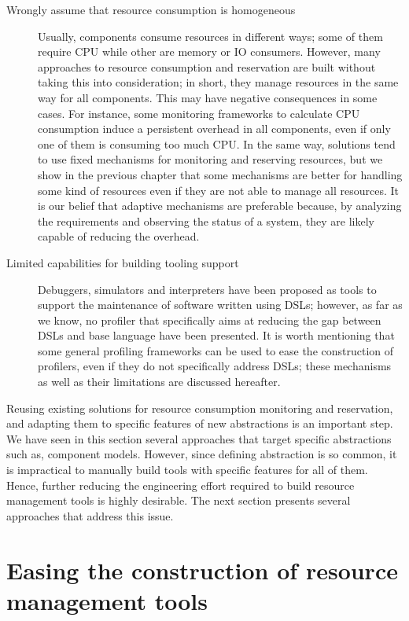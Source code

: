 \begin{description}
\item[Wrongly assume that resource consumption is homogeneous]
Usually, components consume resources in different ways; some of them require CPU while other are memory or IO consumers.
However, many approaches to resource consumption and reservation are built without taking this into consideration; in short, they manage resources in the same way for all components.
This may have negative consequences in some cases.
For instance, some monitoring frameworks to calculate CPU consumption induce a persistent overhead in all components, even if only one of them is consuming too much CPU.
In the same way, solutions tend to use fixed mechanisms for monitoring and reserving resources, but we show in the previous chapter that some mechanisms are better for handling some kind of resources even if they are not able to manage all resources. 
It is our belief that adaptive mechanisms are preferable because, by analyzing the requirements and observing the status of a system, they are likely capable of reducing the overhead.

\item[Limited capabilities for building tooling support] Debuggers, simulators and interpreters have been proposed as tools to support the maintenance of software written using DSLs; however, as far as we know, no profiler that specifically aims at reducing the gap between DSLs and base language have been presented.
It is worth mentioning that some general profiling frameworks can be used to ease the construction of profilers, even if they do not specifically address DSLs; these mechanisms as well as their limitations are discussed hereafter.

\end{description}

Reusing existing solutions for resource consumption monitoring and reservation, and adapting them to specific features of new abstractions is an important step.
We have seen in this section several approaches that target specific abstractions such as, component models.
However, since defining abstraction is so common, it is impractical to manually build tools with specific features for all of them.
Hence, further reducing the engineering effort required to build resource management tools is highly desirable.
The next section presents several approaches that address this issue.

\section{Easing the construction of resource management tools} \label{sec:easy-tools-contruction}

